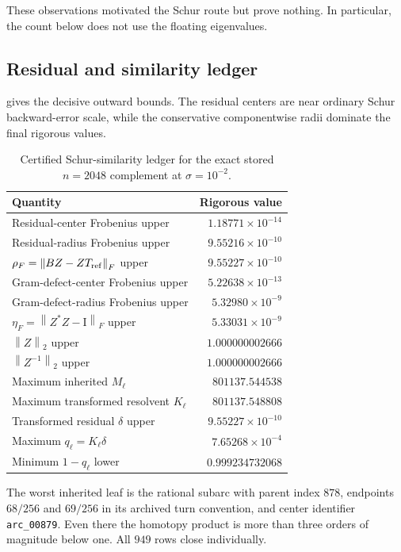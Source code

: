 \documentclass[11pt]{article}
\theoremstyle{definition}
\theoremstyle{remark}
\newcommand{\Id}{\mathrm I}
\newcommand{\norm}[1]{\left\lVert#1\right\rVert}
\newcommand{\Tref}{T_{\rm ref}}
\begin{document}
These observations motivated the Schur route but prove nothing.  In
particular, the count below does not use the floating eigenvalues.

\subsection{Residual and similarity ledger}

 gives the decisive outward bounds.  The residual
centers are near ordinary Schur backward-error scale, while the conservative
componentwise radii dominate the final rigorous values.

\begin{table}[H]
\centering
\caption{Certified Schur-similarity ledger for the exact stored
\(n=2048\) complement at \(\sigma=10^{-2}\).}
\label{tab:certificate}
\begin{tabular}{@{}lr@{}}
\toprule
Quantity & Rigorous value\\
\midrule
Residual-center Frobenius upper & \(1.18771\times10^{-14}\)\\
Residual-radius Frobenius upper & \(9.55216\times10^{-10}\)\\
\(\rho_F=\norm{BZ-Z\Tref}_F\) upper & \(9.55227\times10^{-10}\)\\
Gram-defect-center Frobenius upper & \(5.22638\times10^{-13}\)\\
Gram-defect-radius Frobenius upper & \(5.32980\times10^{-9}\)\\
\(\eta_F=\norm{Z^*Z-\Id}_F\) upper & \(5.33031\times10^{-9}\)\\
\(\norm{Z}_2\) upper & \(1.000000002666\)\\
\(\norm{Z^{-1}}_2\) upper & \(1.000000002666\)\\
Maximum inherited \(M_\ell\) & \(801137.544538\)\\
Maximum transformed resolvent \(K_\ell\) & \(801137.548808\)\\
Transformed residual \(\delta\) upper & \(9.55227\times10^{-10}\)\\
Maximum \(q_\ell=K_\ell\delta\) & \(7.65268\times10^{-4}\)\\
Minimum \(1-q_\ell\) lower & \(0.999234732068\)\\
\bottomrule
\end{tabular}
\end{table}

The worst inherited leaf is the rational subarc with parent index \(878\),
endpoints \(68/256\) and \(69/256\) in its archived turn convention, and
center identifier \texttt{arc\_00879}.  Even there the homotopy product is
more than three orders of magnitude below one.  All \(949\) rows close
individually.
\end{document}
